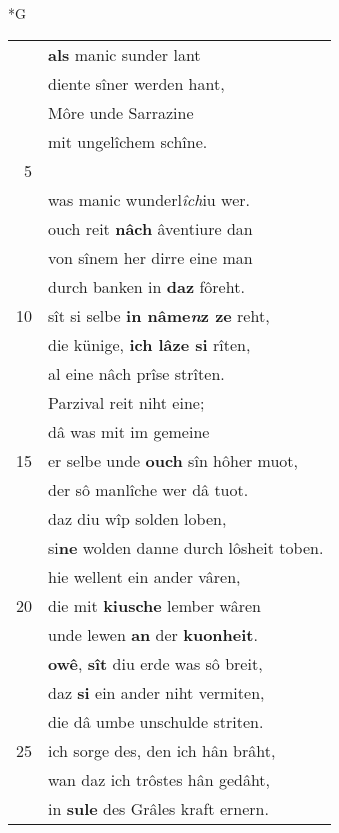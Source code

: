 \documentclass[8pt,a4paper,notitlepage]{article}
\begin{document}
\newpage
\begin{table}[ht]
\begin{minipage}[t]{0.5\linewidth}
\small
\begin{center}*G
\end{center}
\begin{tabular}{rl}
 & \textbf{als} manic sunder lant\\ 
 & diente sîner werden hant,\\ 
 & Môre unde Sarrazine\\ 
 & mit ungelîchem schîne.\\ 
5 & \textbf{\begin{large}M\end{large}it} sînem wît gesamenten her\\ 
 & was manic wunderl\textit{îch}iu wer.\\ 
 & ouch reit \textbf{nâch} âventiure dan\\ 
 & von sînem her dirre eine man\\ 
 & durch banken in \textbf{daz} fôreht.\\ 
10 & sît si selbe \textbf{in nâme\textit{n}z ze} reht,\\ 
 & die künige, \textbf{ich lâze si} rîten,\\ 
 & al eine nâch prîse strîten.\\ 
 & Parzival reit niht eine;\\ 
 & dâ was mit im gemeine\\ 
15 & er selbe unde \textbf{ouch} sîn hôher muot,\\ 
 & der sô manlîche wer dâ tuot.\\ 
 & daz diu wîp solden loben,\\ 
 & si\textbf{ne} wolden danne durch lôsheit toben.\\ 
 & hie wellent ein ander vâren,\\ 
20 & die mit \textbf{kiusche} lember wâren\\ 
 & unde lewen \textbf{an} der \textbf{kuonheit}.\\ 
 & \textbf{owê}, \textbf{sît} diu erde was sô breit,\\ 
 & daz \textbf{si} ein ander niht vermiten,\\ 
 & die dâ umbe unschulde striten.\\ 
25 & ich sorge des, den ich hân brâht,\\ 
 & wan daz ich trôstes hân gedâht,\\ 
 & in \textbf{sule} des Grâles kraft ernern.\\ 

\end{tabular}
\end{minipage}
\end{table}
\end{document}
